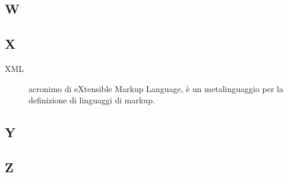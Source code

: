 \documentclass[../manuale-manutentore.tex]{subfiles}
\begin{document}
\subsection{W}

\subsection{X}
\begin{description}
    \item[XML] acronimo di eXtensible Markup Language, è un metalinguaggio per la definizione di linguaggi di markup.
\end{description}

\subsection{Y}

\subsection{Z}
\end{document}
